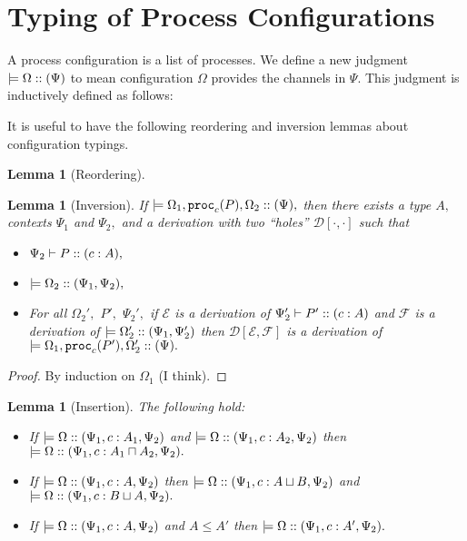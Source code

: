 \documentclass[11pt]{article}
\theoremstyle{plain}
\newtheorem{lemma}[theorem]{Lemma}
\theoremstyle{definition}
\theoremstyle{remark}
\DeclarePairedDelimiter\parens{(}{)}             %
\newcommand{\DD}{\mathcal{D}}
\newcommand{\EE}{\mathcal{E}}
\newcommand{\FF}{\mathcal{F}}
\newcommand\sub{\le}
\newcommand\intersect{\mathbin{\sqcap}}
\newcommand\union{\mathbin{\sqcup}}
\newcommand\irb[1]{\texttt{#1}}
\newcommand{\ctx}{\Psi}
\newcommand{\config}{\Omega}
\newcommand\typeProc[3]{#1 :: \parens{#2 : #3}}
\newcommand\typeS[4]{#1 \vdash \typeProc{#2}{#3}{#4}}
\newcommand\proc[2]{\irb{proc}_{#1}\parens{#2}}
\newcommand\provides[2]{\models #1 :: \parens{#2}}
\begin{document}
\section{Typing of Process Configurations}

A process configuration is a list of processes. We define a new judgment $\provides{\Omega}{\ctx}$ to mean configuration $\Omega$ provides the channels in $\ctx.$ This judgment is inductively defined as follows:


It is useful to have the following reordering and inversion lemmas about configuration typings.

\begin{lemma}[Reordering]
  \label{config-reorder}
\end{lemma}

\begin{lemma}[Inversion]
  \label{config-invert}
  If $\provides{\Omega_1, \proc c P, \Omega_2}{\ctx},$ then there exists a type $A,$ contexts $\ctx_1$ and $\ctx_2,$ and a derivation with two ``holes'' $\DD[\cdot, \cdot]$ such that
  \begin{itemize}
    \item $\typeS{\ctx_2}{P}{c}{A},$
    \item $\provides{\Omega_2}{\ctx_1, \ctx_2},$
    \item For all $\Omega_2',$ $P',$ $\ctx_2',$ if $\EE$ is a derivation of $\typeS{\ctx_2'}{P'}{c}{A}$ and $\FF$ is a derivation of $\provides{\Omega_2'}{\ctx_1, \ctx_2'}$ then $\DD[\EE, \FF]$ is a derivation of $\provides{\Omega_1, \proc{c}{P'}, \Omega_2'}{\ctx}.$
  \end{itemize}
\end{lemma}
\begin{proof}
By induction on $\config_1$ (I think).
\end{proof}

\begin{lemma}[Insertion]
  \label{config-insert}
  The following hold:
  \begin{itemize}
    \item If $\provides{\config}{\ctx_1, c : A_1, \ctx_2}$ and $\provides{\config}{\ctx_1, c : A_2, \ctx_2}$ then $\provides{\config}{\ctx_1, c : A_1 \intersect A_2, \ctx_2}.$
    \item If $\provides{\config}{\ctx_1, c : A, \ctx_2}$ then $\provides{\config}{\ctx_1, c : A \union B, \ctx_2}$ and $\provides{\config}{\ctx_1, c : B \union A, \ctx_2}.$
    \item If $\provides{\config}{\ctx_1, c : A, \ctx_2}$ and $A \sub A'$ then $\provides{\config}{\ctx_1, c : A', \ctx_2}.$
  \end{itemize}

\end{lemma}
\end{document}
